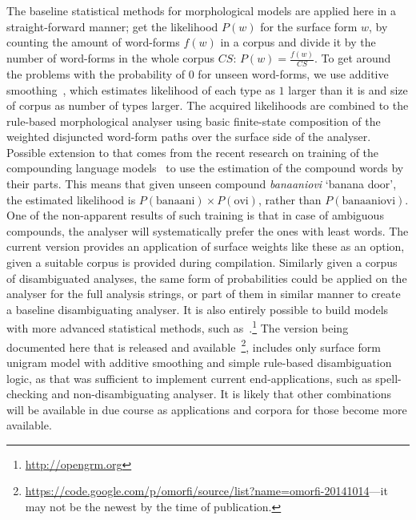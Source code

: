 \documentclass[a4paper,12pt]{article}
\begin{document}
The baseline statistical methods for morphological models are applied here in a
straight-forward manner; get the likelihood $P(w)$ for the surface form $w$, by
counting the amount of word-forms $f(w)$ in a corpus and divide it by the
number of word-forms in the whole corpus $CS$: $P(w) = \frac{f(w)}{CS}$.  To
get around the problems with the probability of $0$ for unseen word-forms, we
use additive smoothing~\citep{chen1999empirical}, which estimates likelihood of
each type as $1$ larger than it is and size of corpus as number of types
larger. The acquired likelihoods are combined to the rule-based morphological
analyser using basic finite-state composition of the weighted disjuncted
word-form paths over the surface side of the analyser. Possible extension to
that comes from the recent research on training of the compounding language
models~\citep{pirinen2009weighting} to use the estimation of the compound words
by their parts. This means that given unseen compound \emph{banaaniovi} `banana
door', the estimated likelihood is $P(\mathrm{banaani}) \times
P(\mathrm{ovi})$, rather than $P(\mathrm{banaaniovi})$. One of the non-apparent
results of such training is that in case of ambiguous compounds, the analyser
will systematically prefer the ones with least words. The current version
provides an application of surface weights like these as an option, given a
suitable corpus is provided during compilation. Similarly given a corpus of
disambiguated analyses, the same form of probabilities could be applied on the
analyser for the full analysis strings, or part of them in similar manner to
create a baseline disambiguating analyser. It is also entirely possible to
build models with more advanced statistical methods, such
as~\citet{opengrm}.\footnote{\url{http://opengrm.org}} The version being
documented here that is released and
available~\footnote{\url{https://code.google.com/p/omorfi/source/list?name=omorfi-20141014}---it
may not be the newest by the time of publication.}, includes only surface form
unigram model with additive smoothing and simple rule-based disambiguation
logic, as that was sufficient to implement current end-applications, such as
spell-checking and non-disambiguating analyser. It is likely that other
combinations will be available in due course as applications and corpora for
those become more available.
\end{document}
